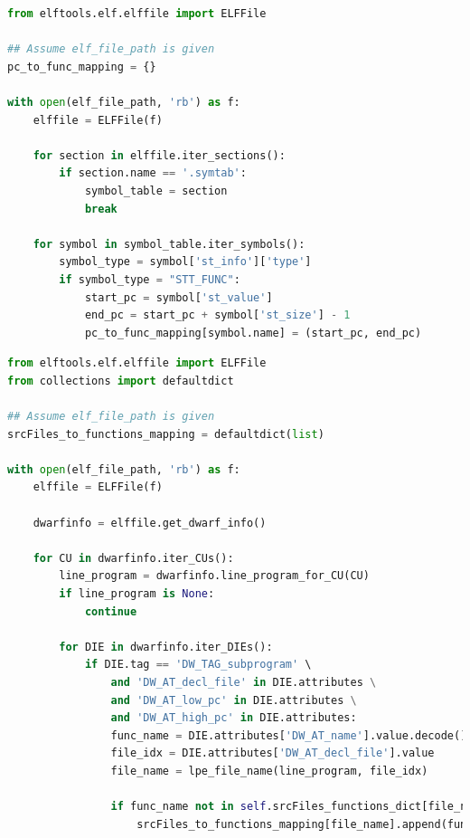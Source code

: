 \begin{center}
\begin{minipage}[t]{\textwidth}
\begin{lstlisting}[language=Python]
from elftools.elf.elffile import ELFFile

## Assume elf_file_path is given
pc_to_func_mapping = {}

with open(elf_file_path, 'rb') as f:
    elffile = ELFFile(f)

    for section in elffile.iter_sections():
        if section.name == '.symtab':
            symbol_table = section
            break

    for symbol in symbol_table.iter_symbols():
        symbol_type = symbol['st_info']['type']
        if symbol_type = "STT_FUNC":
            start_pc = symbol['st_value']
            end_pc = start_pc + symbol['st_size'] - 1
            pc_to_func_mapping[symbol.name] = (start_pc, end_pc)

\end{lstlisting}
\end{minipage}
\end{center}




\begin{center}
\begin{minipage}{\textwidth}
\begin{lstlisting}[language=Python]
from elftools.elf.elffile import ELFFile
from collections import defaultdict

## Assume elf_file_path is given
srcFiles_to_functions_mapping = defaultdict(list)

with open(elf_file_path, 'rb') as f:
    elffile = ELFFile(f)
    
    dwarfinfo = elffile.get_dwarf_info()
    
    for CU in dwarfinfo.iter_CUs():
        line_program = dwarfinfo.line_program_for_CU(CU)
        if line_program is None:
            continue
    
        for DIE in dwarfinfo.iter_DIEs():
            if DIE.tag == 'DW_TAG_subprogram' \
                and 'DW_AT_decl_file' in DIE.attributes \
                and 'DW_AT_low_pc' in DIE.attributes \
                and 'DW_AT_high_pc' in DIE.attributes:
                func_name = DIE.attributes['DW_AT_name'].value.decode()
                file_idx = DIE.attributes['DW_AT_decl_file'].value
                file_name = lpe_file_name(line_program, file_idx)
                
                if func_name not in self.srcFiles_functions_dict[file_name]:
                    srcFiles_to_functions_mapping[file_name].append(func_name)
\end{lstlisting}
\end{minipage}
\end{center}

